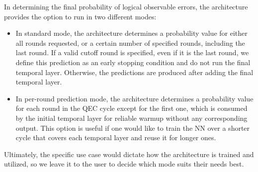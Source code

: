 In determining the final probability of logical observable errors, the architecture provides the option to run in two different modes:
\begin{itemize}
\item In standard mode, the architecture determines a probability value for either all rounds requested, or a certain number of specified rounds, including the last round. If a valid cutoff round is specified, even if it is the last round, we define this prediction as an early stopping condition and do not run the final temporal layer. 
Otherwise, the predictions are produced after adding the final temporal layer.
\item In per-round prediction mode, the architecture determines a probability value for each round in the QEC cycle except for the first one, which is consumed by the initial temporal layer for reliable warmup without any corresponding output. This option is useful if one would like to train the NN over a shorter cycle that covers each temporal layer and reuse it for longer ones.
\end{itemize}
Ultimately, the specific use case would dictate how the architecture is trained and utilized, so we leave it to the user to decide which mode suits their needs best.
